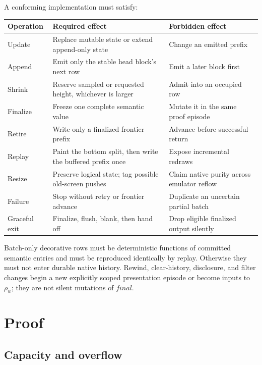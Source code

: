 \documentclass[11pt]{article}
\theoremstyle{definition}
\newcommand{\Final}{\mathit{final}}
\begin{document}
A conforming implementation must satisfy:
\begin{center}
\begin{tabular}{@{}>{\raggedright\arraybackslash}p{}
                    >{\raggedright\arraybackslash}p{}
                    >{\raggedright\arraybackslash}p{}@{}}
\toprule
Operation & Required effect & Forbidden effect\\
\midrule
Update & Replace mutable state or extend append-only state & Change an emitted prefix\\
Append & Emit only the stable head block's next row & Emit a later block first\\
Shrink & Reserve sampled or requested height, whichever is larger & Admit into an occupied row\\
Finalize & Freeze one complete semantic value & Mutate it in the same proof episode\\
Retire & Write only a finalized frontier prefix & Advance before successful return\\
Replay & Paint the bottom split, then write the buffered prefix once & Expose incremental redraws\\
Resize & Preserve logical state; tag possible old-screen pushes & Claim native purity across emulator reflow\\
Failure & Stop without retry or frontier advance & Duplicate an uncertain partial batch\\
Graceful exit & Finalize, flush, blank, then hand off & Drop eligible finalized output silently\\
\bottomrule
\end{tabular}
\end{center}

Batch-only decorative rows must be deterministic functions of committed
semantic entries and must be reproduced identically by replay.  Otherwise they
must not enter durable native history.  Rewind, clear-history, disclosure, and
filter changes begin a new explicitly scoped presentation episode or become
inputs to $\rho_w$; they are not silent mutations of $\Final$.

\section{Proof}
\label{sec:proof}

\subsection{Capacity and overflow}
\end{document}
